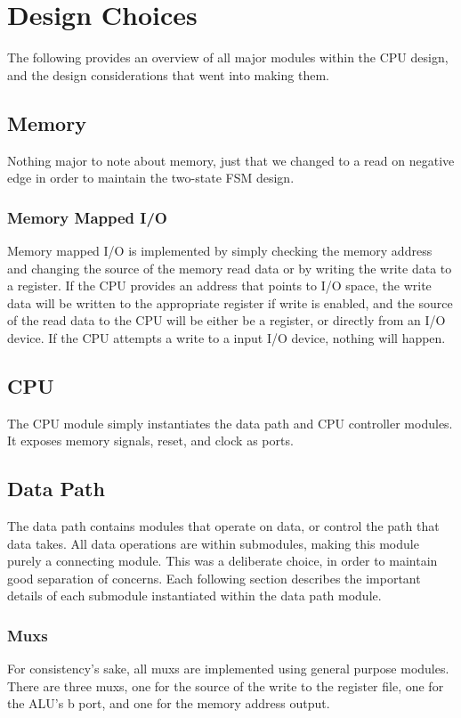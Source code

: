 \documentclass[10pt, portrait, letterpaper]{article}
\begin{document}
  \section{Design Choices} 
  The following provides an overview of all major modules within the CPU design, and the design considerations that went into making them.

  \subsection{Memory} 
  Nothing major to note about memory, just that we changed to a read on negative edge in order to maintain the two-state FSM design.

  \subsubsection{Memory Mapped I/O}
  Memory mapped I/O is implemented by simply checking the memory address and changing the source of the memory read data or by writing the write data to a register. 
  If the CPU provides an address that points to I/O space, the write data will be written to the appropriate register if write is enabled, 
  and the source of the read data to the CPU will be either be a register, or directly from an I/O device. 
  If the CPU attempts a write to a input I/O device, nothing will happen.

  \subsection{CPU} 
  The CPU module simply instantiates the data path and CPU controller modules. It exposes memory signals, reset, and clock as ports.

  \subsection{Data Path} 
  The data path contains modules that operate on data, or control the path that data takes. 
  All data operations are within submodules, making this module purely a connecting module. 
  This was a deliberate choice, in order to maintain good separation of concerns.
  Each following section describes the important details of each submodule instantiated within the data path module.

  \subsubsection{Muxs}
  For consistency's sake, all muxs are implemented using general purpose modules. There are three muxs, one for the source of the write to the register file, one for the ALU's b port, and one for the memory address output.
\end{document}
